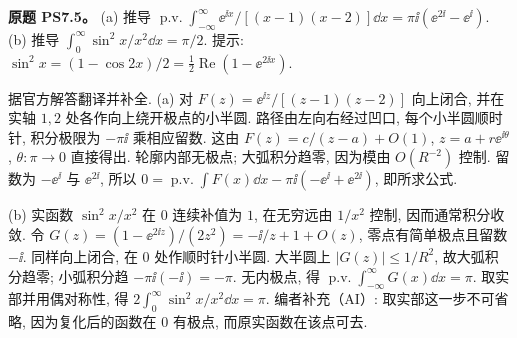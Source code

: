 \begin{exercise}
\textbf{原题 PS7.5。}\label{ass:ps7-5}
(a) 推导 $\operatorname{p.v.}\int_{-\infty}^{\infty}\ee^{\ii x}/[(x-1)(x-2)]\dd x=\pi\ii(\ee^{2\ii}-\ee^{\ii})$.
(b) 推导 $\int_0^\infty\sin^2x/x^2\dd x=\pi/2$. 提示: $\sin^2x=(1-\cos2x)/2=\tfrac12\operatorname{Re}(1-\ee^{2\ii x})$.
\end{exercise}
\begin{solution}
据官方解答翻译并补全.
(a) 对 $F(z)=\ee^{\ii z}/[(z-1)(z-2)]$ 向上闭合, 并在实轴 $1,2$ 处各作向上绕开极点的小半圆. 路径由左向右经过凹口, 每个小半圆顺时针, 积分极限为 $-\pi\ii$ 乘相应留数. 这由 $F(z)=c/(z-a)+O(1)$, $z=a+r\ee^{\ii\theta}$, $\theta:\pi\to0$ 直接得出. 轮廓内部无极点; 大弧积分趋零, 因为模由 $O(R^{-2})$ 控制. 留数为 $-\ee^{\ii}$ 与 $\ee^{2\ii}$, 所以
$0=\operatorname{p.v.}\int F(x)\dd x-\pi\ii(-\ee^{\ii}+\ee^{2\ii})$, 即所求公式.
\begin{center}
\end{center}
(b) 实函数 $\sin^2x/x^2$ 在 $0$ 连续补值为 $1$, 在无穷远由 $1/x^2$ 控制, 因而通常积分收敛. 令 $G(z)=(1-\ee^{2\ii z})/(2z^2)=-\ii/z+1+O(z)$, 零点有简单极点且留数 $-\ii$.
同样向上闭合, 在 $0$ 处作顺时针小半圆. 大半圆上 $|G(z)|\le1/R^2$, 故大弧积分趋零; 小弧积分趋 $-\pi\ii(-\ii)=-\pi$. 无内极点, 得 $\operatorname{p.v.}\int_{-\infty}^{\infty}G(x)\dd x=\pi$. 取实部并用偶对称性, 得 $2\int_0^\infty\sin^2x/x^2\dd x=\pi$. 编者补充（AI）: 取实部这一步不可省略, 因为复化后的函数在 $0$ 有极点, 而原实函数在该点可去.
\end{solution}

